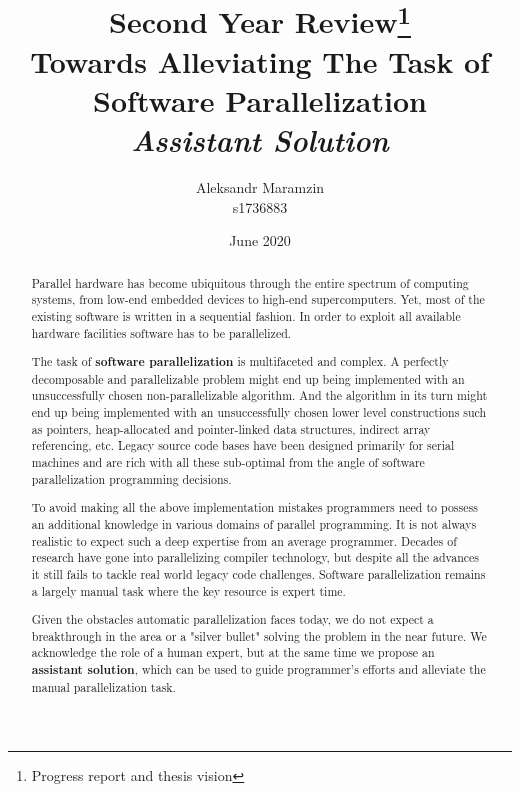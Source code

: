 \documentclass[10pt,a4paper]{report}
\title{\centering \textbf{Second Year Review\thanks{Progress report and thesis vision}}\\Towards Alleviating The Task of Software Parallelization\\\textit{Assistant Solution}}
\author{Aleksandr Maramzin\\s1736883}
\date{June 2020}
\begin{document}
\maketitle

\begin{abstract}


\quad Parallel hardware has become ubiquitous through the entire spectrum of computing systems, from low-end embedded devices to high-end supercomputers. Yet, most of the existing software is written in a sequential fashion. In order to exploit all available hardware facilities software has to be parallelized.


\quad The task of \textbf{software parallelization} is multifaceted and complex. A perfectly decomposable and parallelizable problem might end up being implemented with an unsuccessfully chosen non-parallelizable algorithm. And the algorithm in its turn might end up being implemented with an unsuccessfully chosen lower level constructions such as pointers, heap-allocated and pointer-linked data structures, indirect array referencing, etc. Legacy source code bases have been designed primarily for serial machines and are rich with all these sub-optimal from the angle of software parallelization programming decisions.


\quad To avoid making all the above implementation mistakes programmers need to possess an additional knowledge in various domains of parallel programming. It is not always realistic to expect such a deep expertise from an average programmer. Decades of research have gone into parallelizing compiler technology, but despite all the advances it still fails to tackle real world legacy code challenges. Software parallelization remains a largely manual task where the key resource is expert time.


\quad Given the obstacles automatic parallelization faces today, we do not expect a breakthrough in the area or a "silver bullet" solving the problem in the near future. We acknowledge the role of a human expert, but at the same time we propose an \textbf{assistant solution}, which can be used to guide programmer's efforts and alleviate the manual parallelization task.


\end{abstract}
\end{document}

